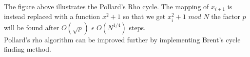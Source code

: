 The figure above illustrates the Pollard's Rho cycle. The mapping of $x_{i+1}$ is instead replaced with a function $x^2+1$ so that we get $x^2_{i}+1$  $mod$ $N$ the factor $p$ will be found after $O(\sqrt{p})$  $\epsilon$ $O(N^{1/4})$ steps. \cite{avalg}\\

Pollard's rho algorithm can be improved further by implementing Brent's cycle finding method. \cite{brent}